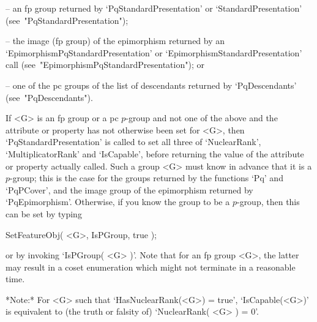 \beginlist%

\item{--}  an  fp   group   returned   by   `PqStandardPresentation'   or
`StandardPresentation' (see~"PqStandardPresentation");

\item{--} the  image  (fp  group)  of  the  epimorphism  returned  by  an
`EpimorphismPqStandardPresentation' or  `EpimorphismStandardPresentation'
call (see~"EpimorphismPqStandardPresentation"); or

\item{--} one of the pc groups of the list  of  descendants  returned  by
`PqDescendants' (see~"PqDescendants").

\endlist

If <G> is an fp group or a pc $p$-group and not one of the above and
the attribute or property has not otherwise been set for <G>, then
`PqStandardPresentation' is called to set all three of `NuclearRank',
`MultiplicatorRank' and `IsCapable', before returning the value of the
attribute or property actually called.  Such a group <G> must know in
advance that it is a $p$-group; this is the case for the groups
returned by the functions `Pq' and `PqPCover', and the image group of
the epimorphism returned by `PqEpimorphism'.  Otherwise, if you know
the group to be a $p$-group, then this can be set by typing 

SetFeatureObj( <G>, IsPGroup, true );

or by invoking `IsPGroup( <G> )'.  Note that for an fp group <G>, the
latter may result in a coset enumeration which might not
terminate in a reasonable time.

*Note:* For <G> such that `HasNuclearRank(<G>) = true',  `IsCapable(<G>)'
is equivalent to (the truth or falsity of) `NuclearRank( <G> ) = 0'.

